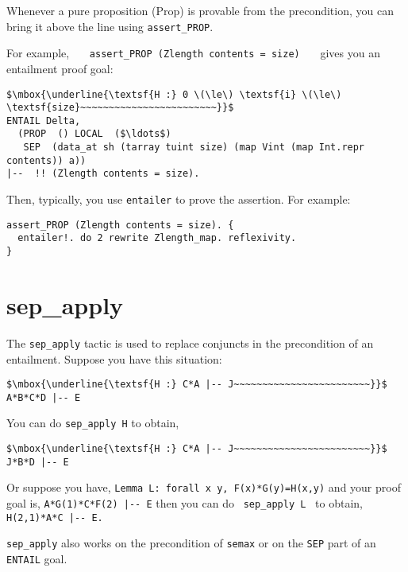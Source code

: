 \documentclass[12pt,fleqn,openany,oneside,showtrims]{memoir}
\begin{document}
Whenever a pure proposition (\textsf{Prop}) is provable from the precondition, you can bring it above the line using \lstinline{assert_PROP}.

For example, ~~~\lstinline{assert_PROP (Zlength contents = size)}~~~
gives you an entailment proof goal:

\begin{lstlisting}
$\mbox{\underline{\textsf{H :} 0 \(\le\) \textsf{i} \(\le\) \textsf{size}~~~~~~~~~~~~~~~~~~~~~~~~}}$
ENTAIL Delta,
  (PROP  () LOCAL  ($\ldots$)
   SEP  (data_at sh (tarray tuint size) (map Vint (map Int.repr contents)) a))
|--  !! (Zlength contents = size).
\end{lstlisting}

Then, typically, you use \lstinline{entailer} to prove the assertion.
For example:

\begin{lstlisting}
assert_PROP (Zlength contents = size). {
  entailer!. do 2 rewrite Zlength_map. reflexivity.
}
\end{lstlisting}


\chapter{sep\_apply}
\label{refcard:sep-apply}

The \lstinline{sep_apply} tactic is used to replace conjuncts in the
precondition of an entailment.
Suppose you have this situation:

\begin{lstlisting}
$\mbox{\underline{\textsf{H :} C*A |-- J~~~~~~~~~~~~~~~~~~~~~~~~}}$
A*B*C*D |-- E
\end{lstlisting}

You can do \lstinline{sep_apply H} to obtain,

\begin{lstlisting}
$\mbox{\underline{\textsf{H :} C*A |-- J~~~~~~~~~~~~~~~~~~~~~~~~}}$
J*B*D |-- E
\end{lstlisting}

Or suppose you have,\quad  
\lstinline{Lemma L: forall x y, F(x)*G(y)=H(x,y)} \newline
and your proof goal is, \quad   \lstinline{A*G(1)*C*F(2) |-- E} \newline
then you can do ~\lstinline{sep_apply L}~ to obtain,
\quad \lstinline{H(2,1)*A*C |-- E.} 

\lstinline{sep_apply} also works on the precondition of \lstinline{semax} or on the \lstinline{SEP} part of an \lstinline{ENTAIL} goal.
\end{document}
